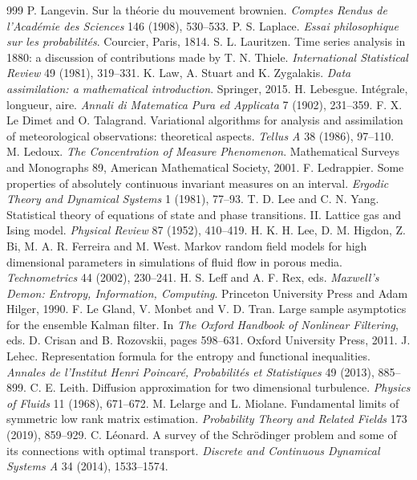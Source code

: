 \begin{thebibliography}{999}
 P. Langevin. Sur la th\'eorie du mouvement brownien. \emph{Comptes Rendus de l'Acad\'emie des Sciences} 146 (1908), 530--533.
 P. S. Laplace. \emph{Essai philosophique sur les probabilit\'es}. Courcier, Paris, 1814.
 S. L. Lauritzen. Time series analysis in 1880: a discussion of contributions made by T. N. Thiele. \emph{International Statistical Review} 49 (1981), 319--331.
 K. Law, A. Stuart and K. Zygalakis. \emph{Data assimilation: a mathematical introduction}. Springer, 2015.
 H. Lebesgue. Int\'egrale, longueur, aire. \emph{Annali di Matematica Pura ed Applicata} 7 (1902), 231--359.
 F. X. Le Dimet and O. Talagrand. Variational algorithms for analysis and assimilation of meteorological observations: theoretical aspects. \emph{Tellus A} 38 (1986), 97--110.
 M. Ledoux. \emph{The Concentration of Measure Phenomenon}. Mathematical Surveys and Monographs 89, American Mathematical Society, 2001.
 F. Ledrappier. Some properties of absolutely continuous invariant measures on an interval. \emph{Ergodic Theory and Dynamical Systems} 1 (1981), 77--93.
 T. D. Lee and C. N. Yang. Statistical theory of equations of state and phase transitions. II. Lattice gas and Ising model. \emph{Physical Review} 87 (1952), 410--419.
 H. K. H. Lee, D. M. Higdon, Z. Bi, M. A. R. Ferreira and M. West. Markov random field models for high dimensional parameters in simulations of fluid flow in porous media. \emph{Technometrics} 44 (2002), 230--241.
 H. S. Leff and A. F. Rex, eds. \emph{Maxwell's Demon: Entropy, Information, Computing}. Princeton University Press and Adam Hilger, 1990.
 F. Le Gland, V. Monbet and V. D. Tran. Large sample asymptotics for the ensemble Kalman filter. In \emph{The Oxford Handbook of Nonlinear Filtering}, eds. D. Crisan and B. Rozovskii, pages 598--631. Oxford University Press, 2011.
 J. Lehec. Representation formula for the entropy and functional inequalities. \emph{Annales de l'Institut Henri Poincar\'e, Probabilit\'es et Statistiques} 49 (2013), 885--899.
 C. E. Leith. Diffusion approximation for two dimensional turbulence. \emph{Physics of Fluids} 11 (1968), 671--672.
 M. Lelarge and L. Miolane. Fundamental limits of symmetric low rank matrix estimation. \emph{Probability Theory and Related Fields} 173 (2019), 859--929.
 C. L\'eonard. A survey of the Schr\"odinger problem and some of its connections with optimal transport. \emph{Discrete and Continuous Dynamical Systems A} 34 (2014), 1533--1574.

\end{thebibliography}
